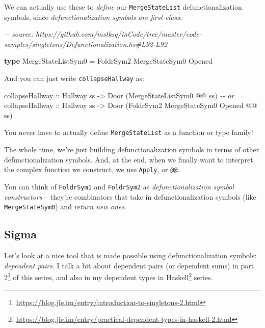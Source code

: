 \documentclass[]{article}
\newenvironment{Shaded}{}{}
\newcommand{\CommentTok}[1]{\textcolor[rgb]{0.38,0.63,0.69}{\textit{#1}}}
\newcommand{\DataTypeTok}[1]{\textcolor[rgb]{0.56,0.13,0.00}{#1}}
\newcommand{\KeywordTok}[1]{\textcolor[rgb]{0.00,0.44,0.13}{\textbf{#1}}}
\newcommand{\NormalTok}[1]{#1}
\newcommand{\OperatorTok}[1]{\textcolor[rgb]{0.40,0.40,0.40}{#1}}
\newcommand{\OtherTok}[1]{\textcolor[rgb]{0.00,0.44,0.13}{#1}}
\renewcommand{\href}[2]{#2\footnote{\url{#1}}}
\begin{document}
We can actually use these to \emph{define} our \texttt{MergeStateList}
defunctionalization symbols, since \emph{defunctionalization symbols are
first-class}:

\begin{Shaded}
\begin{Highlighting}[]
\CommentTok{{-}{-} source: https://github.com/mstksg/inCode/tree/master/code{-}samples/singletons/Defunctionalization.hs\#L92{-}L92}

\KeywordTok{type} \DataTypeTok{MergeStateListSym0} \OtherTok{=} \DataTypeTok{FoldrSym2} \DataTypeTok{MergeStateSym0} \DataTypeTok{\textquotesingle{}Opened}
\end{Highlighting}
\end{Shaded}

And you can just write \texttt{collapseHallway} as:

\begin{Shaded}
\begin{Highlighting}[]
\OtherTok{collapseHallway ::} \DataTypeTok{Hallway}\NormalTok{ ss }\OtherTok{{-}\textgreater{}} \DataTypeTok{Door}\NormalTok{ (}\DataTypeTok{MergeStateListSym0} \OperatorTok{@@}\NormalTok{ ss)}
\CommentTok{{-}{-} or}
\OtherTok{collapseHallway ::} \DataTypeTok{Hallway}\NormalTok{ ss }\OtherTok{{-}\textgreater{}} \DataTypeTok{Door}\NormalTok{ (}\DataTypeTok{FoldrSym2} \DataTypeTok{MergeStateSym0} \DataTypeTok{\textquotesingle{}Opened} \OperatorTok{@@}\NormalTok{ ss)}
\end{Highlighting}
\end{Shaded}

You never have to actually define \texttt{MergeStateList} as a function or type
family!

The whole time, we're just building defunctionalization symbols in terms of
other defunctionalization symbols. And, at the end, when we finally want to
interpret the complex function we construct, we use \texttt{Apply}, or
\texttt{@@}.

You can think of \texttt{FoldrSym1} and \texttt{FoldrSym2} as
\emph{defunctionalization symbol constructors} -- they're combinators that take
in defunctionalization symbols (like \texttt{MergeStateSym0}) and \emph{return
new ones}.

\subsection{Sigma}\label{sigma}

Let's look at a nice tool that is made possible using defunctionalization
symbols: \emph{dependent pairs}. I talk a bit about dependent pairs (or
dependent sums) in
\href{https://blog.jle.im/entry/introduction-to-singletons-2.html}{part 2} of
this series, and also in my
\href{https://blog.jle.im/entry/practical-dependent-types-in-haskell-2.html}{dependent
types in Haskell} series.
\end{document}

